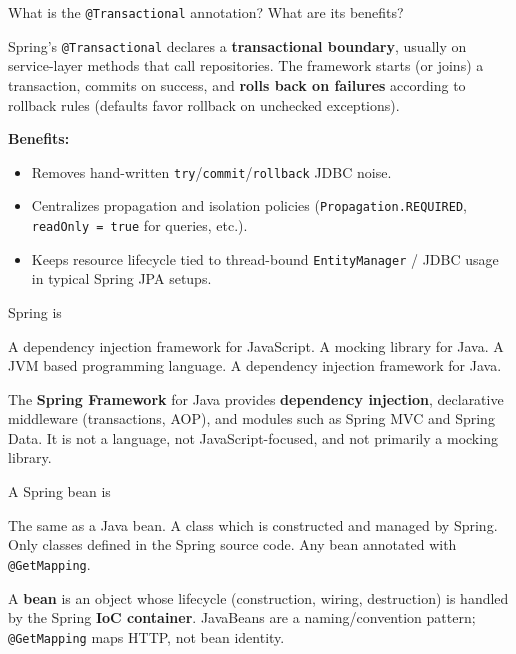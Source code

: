 \question[4]
What is the \texttt{@Transactional} annotation? What are its benefits?
\begin{solutionorbox}[1.35in]
  Spring's \texttt{@Transactional} declares a \textbf{transactional boundary}, usually on service-layer methods that call repositories. The framework starts (or joins) a transaction, commits on success, and \textbf{rolls back on failures} according to rollback rules (defaults favor rollback on unchecked exceptions).

  \noindent\textbf{Benefits:}
  \begin{itemize}
    \item Removes hand-written \texttt{try}/\texttt{commit}/\texttt{rollback} JDBC noise.
    \item Centralizes propagation and isolation policies (\texttt{Propagation.REQUIRED}, \texttt{readOnly = true} for queries, etc.).
    \item Keeps resource lifecycle tied to thread-bound \texttt{EntityManager} / JDBC usage in typical Spring JPA setups.
  \end{itemize}
\end{solutionorbox}

\newpage

\question[4]
Spring is
\begin{choices}
  \choice A dependency injection framework for JavaScript.
  \choice A mocking library for Java.
  \choice A JVM based programming language.
  \CorrectChoice A dependency injection framework for Java.
\end{choices}
\begin{solution}
  The \textbf{Spring Framework} for Java provides \textbf{dependency injection}, declarative middleware (transactions, AOP), and modules such as Spring MVC and Spring Data. It is not a language, not JavaScript-focused, and not primarily a mocking library.
\end{solution}

\question[4]
A Spring bean is
\begin{choices}
  \choice The same as a Java bean.
  \CorrectChoice A class which is constructed and managed by Spring.
  \choice Only classes defined in the Spring source code.
  \choice Any bean annotated with \texttt{@GetMapping}.
\end{choices}
\begin{solution}
  A \textbf{bean} is an object whose lifecycle (construction, wiring, destruction) is handled by the Spring \textbf{IoC container}. JavaBeans are a naming/convention pattern; \texttt{@GetMapping} maps HTTP, not bean identity.
\end{solution}

